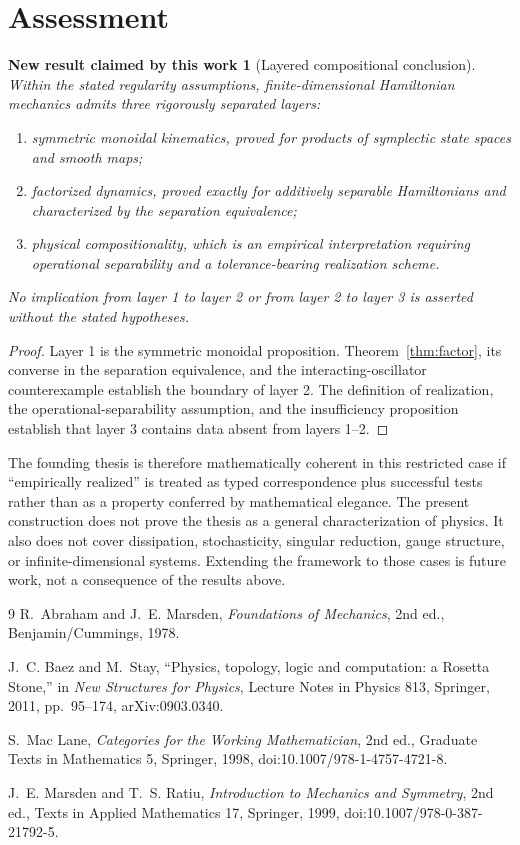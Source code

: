 \documentclass[11pt]{article}
\newtheorem{newresult}[definition]{New result claimed by this work}
\begin{document}
\section{Assessment}

\begin{newresult}[Layered compositional conclusion]
Within the stated regularity assumptions, finite-dimensional Hamiltonian mechanics admits three rigorously separated layers:
\begin{enumerate}
\item symmetric monoidal kinematics, proved for products of symplectic state spaces and smooth maps;
\item factorized dynamics, proved exactly for additively separable Hamiltonians and characterized by the separation equivalence;
\item physical compositionality, which is an empirical interpretation requiring operational separability and a tolerance-bearing realization scheme.
\end{enumerate}
No implication from layer 1 to layer 2 or from layer 2 to layer 3 is asserted without the stated hypotheses.
\end{newresult}
\begin{proof}
Layer 1 is the symmetric monoidal proposition.  Theorem~\ref{thm:factor}, its converse in the separation equivalence, and the interacting-oscillator counterexample establish the boundary of layer 2.  The definition of realization, the operational-separability assumption, and the insufficiency proposition establish that layer 3 contains data absent from layers 1--2.
\end{proof}

The founding thesis is therefore mathematically coherent in this restricted case if ``empirically realized'' is treated as typed correspondence plus successful tests rather than as a property conferred by mathematical elegance.  The present construction does not prove the thesis as a general characterization of physics.  It also does not cover dissipation, stochasticity, singular reduction, gauge structure, or infinite-dimensional systems.  Extending the framework to those cases is future work, not a consequence of the results above.

\begin{thebibliography}{9}
R.~Abraham and J.~E. Marsden,
\emph{Foundations of Mechanics}, 2nd ed., Benjamin/Cummings, 1978.

J.~C. Baez and M.~Stay,
``Physics, topology, logic and computation: a Rosetta Stone,''
in \emph{New Structures for Physics}, Lecture Notes in Physics 813,
Springer, 2011, pp.~95--174, arXiv:0903.0340.

S.~Mac Lane,
\emph{Categories for the Working Mathematician}, 2nd ed.,
Graduate Texts in Mathematics 5, Springer, 1998,
doi:10.1007/978-1-4757-4721-8.

J.~E. Marsden and T.~S. Ratiu,
\emph{Introduction to Mechanics and Symmetry}, 2nd ed.,
Texts in Applied Mathematics 17, Springer, 1999,
doi:10.1007/978-0-387-21792-5.
\end{thebibliography}
\end{document}
